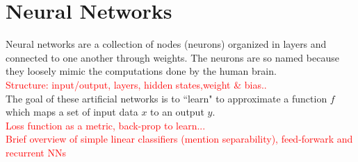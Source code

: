\documentclass[12pt]{article}
\begin{document}
\section{Neural Networks}
Neural networks are a collection of nodes (neurons) organized in layers and connected to one another through weights. The neurons are so named because they loosely mimic the computations done by the human brain. \\
\textcolor{red}{Structure: input/output, layers, hidden states,weight \& bias.. } \\
The goal of these artificial networks is to ``learn" to approximate a function $f$ which maps a set of input data $x$ to an output $y$.  \\
\textcolor{red}{Loss function as a metric, back-prop to learn...}\\
\textcolor{red}{Brief overview of simple linear classifiers (mention separability), feed-forwark and recurrent NNs}\\
\end{document}

